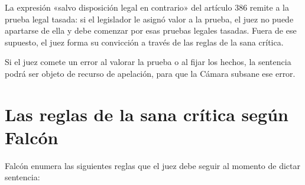 \documentclass[12pt,oneside]{book}
\begin{document}
\begin{note}
La expresión «salvo disposición legal en contrario» del artículo 386 remite a la prueba legal tasada: si el legislador le asignó valor a la prueba, el juez no puede apartarse de ella y debe comenzar por esas pruebas legales tasadas. Fuera de ese supuesto, el juez forma su convicción a través de las reglas de la sana crítica.
\end{note}

Si el juez comete un error al valorar la prueba o al fijar los hechos, la sentencia podrá ser objeto de recurso de apelación, para que la Cámara subsane ese error.

\section{Las reglas de la sana crítica según Falcón}

Falcón enumera las siguientes reglas que el juez debe seguir al momento de dictar sentencia:
\end{document}
